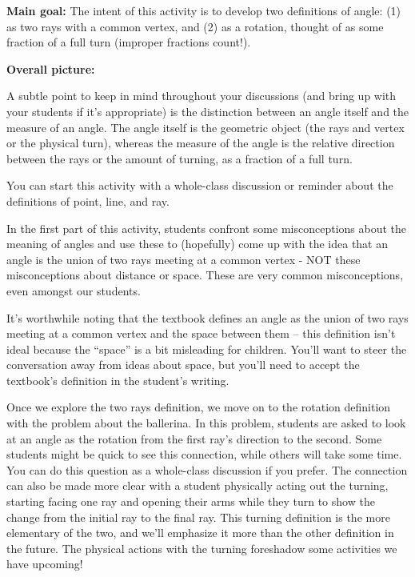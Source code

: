 \documentclass[nooutcomes,noauthor]{ximera}
\begin{document}
\begin{instructorNotes}

{\bf Main goal:}
The intent of this activity is to develop two definitions of angle:
(1) as two rays with a common vertex, and (2) as a rotation, thought of as some fraction of a full turn (improper fractions count!).  



{\bf Overall picture:}

A subtle point to keep in mind throughout your discussions (and bring up with your students if it's appropriate) is the distinction between an angle itself and the measure of an angle. The angle itself is the geometric object (the rays and vertex or the physical turn), whereas the measure of the angle is the relative direction between the rays or the amount of turning, as a fraction of a full turn. 



You can start this activity with a whole-class discussion or reminder about the definitions of point, line, and ray.

In the first part of this activity, students confront some misconceptions about the meaning of angles and use these to (hopefully) come up with the idea that an angle is the union of two rays meeting at a common vertex - NOT these misconceptions about distance or space. These are very common misconceptions, even amongst our students.

It's worthwhile noting that the textbook defines an angle as the union of two rays meeting at a common vertex and the space between them -- this definition isn't ideal because the ``space'' is a bit misleading for children. You'll want to steer the conversation away from ideas about space, but you'll need to accept the textbook's definition in the student's writing.

    Once we explore the two rays definition, we move on to the rotation definition with the problem about the ballerina. In this problem, students are asked to look at an angle as the rotation from the first ray’s direction to the second.  Some students might be quick to see this connection, while others will take some time. You can do this question as a whole-class discussion if you prefer. The connection can also be made more clear with a student physically acting out the turning, starting facing one ray and opening their arms while they turn to show the change from the initial ray to the final ray.  This turning definition is the more elementary of the two, and we'll emphasize it more than the other definition in the future. The physical actions with the turning foreshadow some activities we have upcoming!




\end{instructorNotes}
\end{document}
